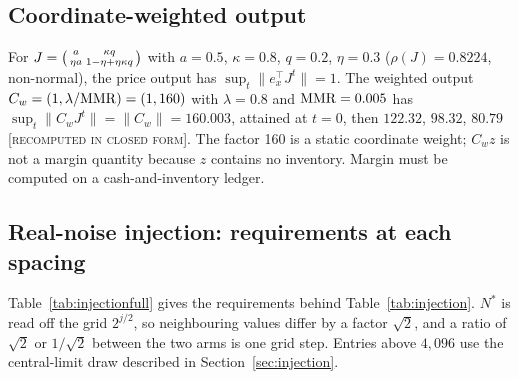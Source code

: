 \documentclass[12pt]{article}
\theoremstyle{definition}
\theoremstyle{remark}
\newcommand{\lab}[1]{\textsc{[#1]}}
\begin{document}
\subsection{Coordinate-weighted output}\label{app:coordw}
For $J=\begin{psmallmatrix}a&\kappa q\\ \eta a&1-\eta+\eta\kappa q\end{psmallmatrix}$ with $a=0.5$, $\kappa=0.8$, $q=0.2$, $\eta=0.3$ ($\rho(J)=0.8224$, non-normal), the price output has $\sup_t\|e_x^\top J^t\|=1$. The weighted output $C_w=(1,\lambda/{\rm MMR})=(1,160)$ with $\lambda=0.8$ and ${\rm MMR}=0.005$ has $\sup_t\|C_wJ^t\|=\|C_w\|=160.003$, attained at $t=0$, then $122.32$, $98.32$, $80.79$ \lab{recomputed in closed form}. The factor 160 is a static coordinate weight; $C_wz$ is not a margin quantity because $z$ contains no inventory. Margin must be computed on a cash-and-inventory ledger.

\subsection{Real-noise injection: requirements at each spacing}\label{app:injection}

Table~\ref{tab:injectionfull} gives the requirements behind Table~\ref{tab:injection}. $N^*$ is read off the grid $2^{j/2}$, so neighbouring values differ by a factor $\sqrt2$, and a ratio of $\sqrt2$ or $1/\sqrt2$ between the two arms is one grid step. Entries above $4{,}096$ use the central-limit draw described in Section~\ref{sec:injection}.
\end{document}
